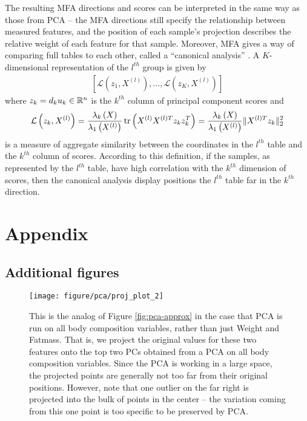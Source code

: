 \documentclass{article}
\begin{document}
The resulting MFA directions and scores can be interpreted in the same
way as those from PCA -- the MFA directions still specify the
relationship between measured features, and the position of each
sample's projection describes the relative weight of each feature for
that sample. Moreover, MFA gives a way of comparing full tables to
each other, called a ``canonical analysis'' \cite{pages2004multiple}. A
$K$-dimensional representation of the $l^{th}$ group is given by
\begin{align*}
\left[\mathcal{L}\left(z_{1}, X^{(l)}\right), \dots,
  \mathcal{L}\left(z_{K}, X^{(l)}\right)\right]
\end{align*}
where $z_{k} = d_{k}u_{k} \in \mathbb{R}^{n}$ is the $k^{th}$ column of principal
component scores and
\begin{align*}
  \mathcal{L}\left(z_{k}, X^{(l)}\right) =
  \frac{\lambda_{k}\left(X\right)}{\lambda_{1}\left(X^{(l)}\right)}\mathop\mathrm{tr}\left(X^{(l)}X^{(l)
      T} z_{k}z_{k}^{T}\right) =
  \frac{\lambda_{k}\left(X\right)}{\lambda_{1}\left(X^{(l)}\right)}\|X^{(l)
  T} z_{k}\|^{2}_{2}
\end{align*}
is a measure of aggregate similarity between the coordinates in the $l^{th}$
table and the $k^{th}$ column of scores. According to this definition, if the
samples, as represented by the $l^{th}$ table, have high correlation with the
$k^{th}$ dimension of scores, then the canonical analysis display positions the
$l^{th}$ table far in the $k^{th}$ direction.




\section{Appendix}

\subsection{Additional figures}

\begin{figure}
  \texttt{[image: figure/pca/proj\_plot\_2]}
  \caption{This is the analog of Figure \ref{fig:pca-approx} in the case that
    PCA is run on all body composition variables, rather than just Weight and
    Fatmass. That is, we project the original values for these two features
    onto the top two PCs obtained from a PCA on all body composition variables.
    Since the PCA is working in a large space, the projected points are
    generally not too far from their original positions. However, note that one
    outlier on the far right is projected into the bulk of points in the center
    -- the variation coming from this one point is too specific to be preserved
    by PCA.
  \label{fig:pca-approx-2}}
\end{figure}
\end{document}
